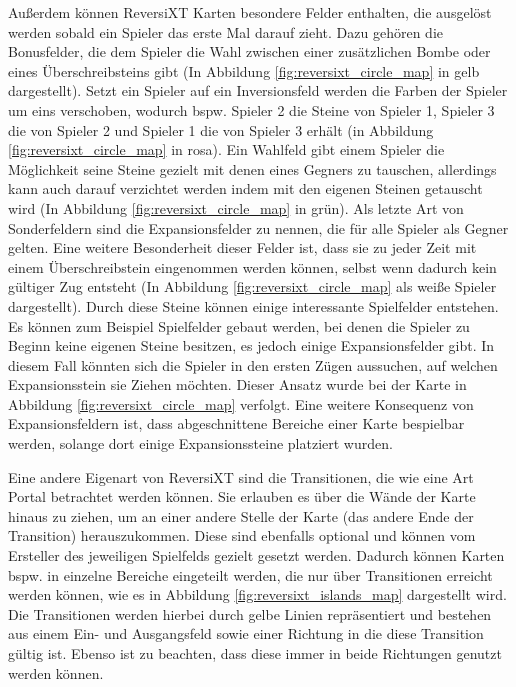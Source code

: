 \documentclass[12pt,a4paper,bibliography=totocnumbered,listof=totocnumbered]{article}
\begin{document}
Außerdem können ReversiXT Karten besondere Felder enthalten, die ausgelöst werden sobald ein Spieler das erste Mal darauf zieht. Dazu gehören die Bonusfelder, die dem Spieler die Wahl zwischen einer zusätzlichen Bombe oder eines Überschreibsteins gibt (In Abbildung \ref{fig:reversixt_circle_map} in gelb dargestellt). Setzt ein Spieler auf ein Inversionsfeld werden die Farben der Spieler um eins verschoben, wodurch bspw. Spieler 2 die Steine von Spieler 1, Spieler 3 die von Spieler 2 und Spieler 1 die von Spieler 3 erhält (in Abbildung \ref{fig:reversixt_circle_map} in rosa). Ein Wahlfeld gibt einem Spieler die Möglichkeit seine Steine gezielt mit denen eines Gegners zu tauschen, allerdings kann auch darauf verzichtet werden indem mit den eigenen Steinen \glqq getauscht\grqq{} wird (In Abbildung \ref{fig:reversixt_circle_map} in grün). Als letzte Art von Sonderfeldern sind die Expansionsfelder zu nennen, die für alle Spieler als Gegner gelten. Eine weitere Besonderheit dieser Felder ist, dass sie zu jeder Zeit mit einem Überschreibstein eingenommen werden können, selbst wenn dadurch kein gültiger Zug entsteht (In Abbildung \ref{fig:reversixt_circle_map} als weiße Spieler dargestellt). Durch diese Steine können einige interessante Spielfelder entstehen. Es können zum Beispiel Spielfelder gebaut werden, bei denen die Spieler zu Beginn keine eigenen Steine besitzen, es jedoch einige Expansionsfelder gibt. In diesem Fall könnten sich die Spieler in den ersten Zügen aussuchen, auf welchen Expansionsstein sie Ziehen möchten. Dieser Ansatz wurde bei der Karte in Abbildung \ref{fig:reversixt_circle_map} verfolgt. Eine weitere Konsequenz von Expansionsfeldern ist, dass abgeschnittene Bereiche einer Karte bespielbar werden, solange dort einige Expansionssteine platziert wurden.

Eine andere Eigenart von ReversiXT sind die Transitionen, die wie eine Art Portal betrachtet werden können. Sie erlauben es über die Wände der Karte hinaus zu ziehen, um an einer andere Stelle der Karte (das andere Ende der Transition) herauszukommen. Diese sind ebenfalls optional und können vom Ersteller des jeweiligen Spielfelds gezielt gesetzt werden. Dadurch können Karten bspw. in einzelne Bereiche eingeteilt werden, die nur über Transitionen erreicht werden können, wie es in Abbildung \ref{fig:reversixt_islands_map} dargestellt wird. Die Transitionen werden hierbei durch gelbe Linien repräsentiert und bestehen aus einem Ein- und Ausgangsfeld sowie einer Richtung in die diese Transition gültig ist. Ebenso ist zu beachten, dass diese immer in beide Richtungen genutzt werden können.
\end{document}

